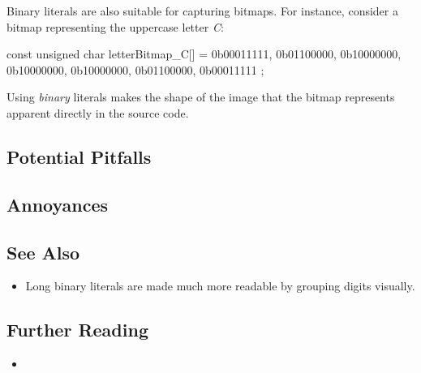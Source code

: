 Binary literals are also suitable for capturing bitmaps. For instance,
consider a bitmap representing the uppercase letter \textit{C}\/:

\begin{emcppslisting}
const unsigned char letterBitmap_C[] =
{
    0b00011111,
    0b01100000,
    0b10000000,
    0b10000000,
    0b10000000,
    0b01100000,
    0b00011111
};
\end{emcppslisting}


\noindent Using \emph{binary} literals makes the shape of the image that the
bitmap represents apparent directly in the source code.

\subsection[Potential Pitfalls]{Potential Pitfalls}\label{potential-pitfalls}

\hspace*{\fill}

\subsection[Annoyances]{Annoyances}\label{annoyances}

\hspace*{\fill}

\subsection[See Also]{See Also}\label{see-also}

\begin{itemize}
\item{%
Long binary literals are made much more readable by grouping digits visually.}
\end{itemize}

\subsection[Further Reading]{Further Reading}\label{further-reading}

\begin{itemize}
\item{\cite{informit}}
\end{itemize}


